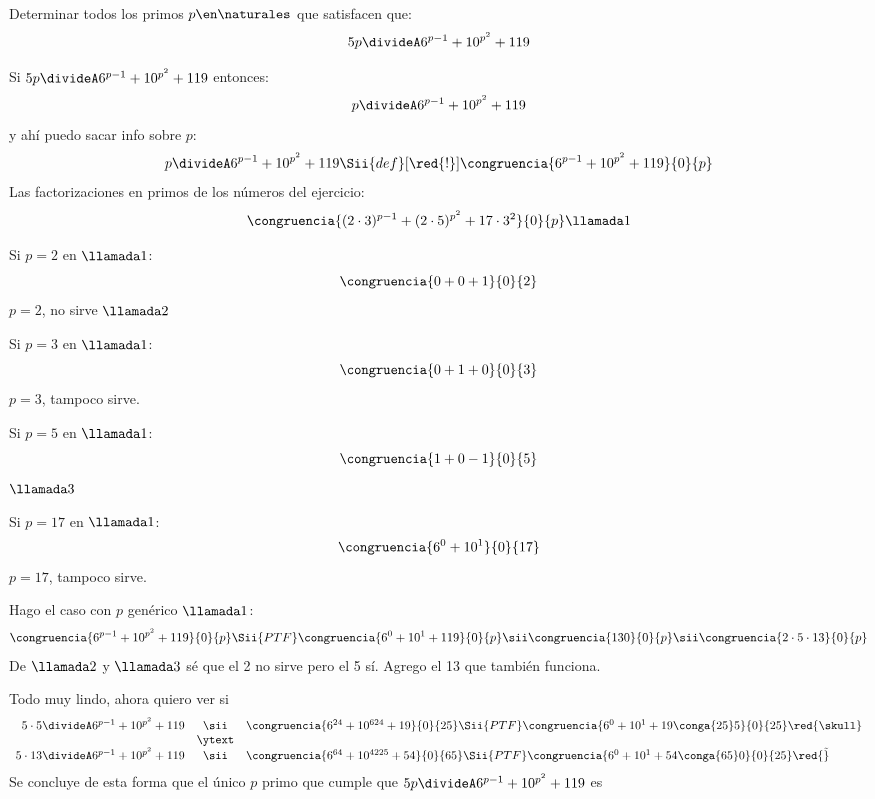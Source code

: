 \begin{enunciado}{\ejExtra}
	Determinar todos los primos $p \en \naturales$ que satisfacen que:
	$$
		5p \divideA 6^{p-1} + 10^{p^2} + 119
	$$
\end{enunciado}
Si $ 5p \divideA 6^{p-1} + 10^{p^2} + 119$ entonces:
$$
	p \divideA 6^{p-1} + 10^{p^2} + 119
$$
y ahí puedo sacar info sobre $p$:
$$
	p \divideA 6^{p-1} + 10^{p^2} + 119
	\Sii{def}[\red{!}]
	\congruencia{6^{p-1} + 10^{p^2} + 119}{0}{p}
$$
Las factorizaciones en primos de los números del ejercicio:
$$
	\congruencia{(2\cdot 3)^{p-1} + (2 \cdot 5)^{p^2} + 17 \cdot 3^2}{0}{p} \llamada1
$$

Si $p = 2$ en $\llamada1$:
$$
	\congruencia{0 + 0 + 1}{0}{2}
$$
$p = 2$, no sirve $\llamada2$

Si $p = 3$ en $\llamada1$:
$$
	\congruencia{0 + 1 + 0}{0}{3}
$$
$p = 3$, tampoco sirve.

Si $p = 5$ en $\llamada1$:
$$
	\congruencia{1 + 0 -1}{0}{5}
$$
 $\llamada3$

Si $p = 17$ en $\llamada1$:
$$
	\congruencia{6^0 + 10^1}{0}{17}
$$
$p = 17$, tampoco sirve.

\bigskip

Hago el caso con $p$ genérico $\llamada1$:
$$
	\congruencia{6^{p-1} + 10^{p^2} + 119}{0}{p}
	\Sii{PTF}
	\congruencia{6^0 + 10^1 + 119}{0}{p}
	\sii
	\congruencia{130}{0}{p}
	\sii
	\congruencia{2 \cdot 5 \cdot 13}{0}{p}
$$
De $\llamada2$ y $\llamada3$ sé que el 2 no sirve pero el 5 sí. Agrego el 13 que también funciona.

Todo muy lindo, ahora quiero ver si
$$
	\begin{array}{rcl}
		5 \cdot 5 \divideA 6^{p-1} + 10^{p^2} + 119
		 & \sii   &
		\congruencia{6^{24} + 10^{624} + 19}{0}{25}
		\Sii{PTF}
		\congruencia{6^0 + 10^1 + 19 \conga{25} 5}{0}{25} \red{\skull}
		\\
		 & \ytext & \\
		5 \cdot 13 \divideA 6^{p-1} + 10^{p^2} + 119
		 & \sii   &
		\congruencia{6^{64} + 10^{4225} + 54}{0}{65}
		\Sii{PTF}
		\congruencia{6^0 + 10^1 + 54 \conga{65} 0}{0}{25} \red{\Tilde}
	\end{array}
$$
Se concluye de esta forma que el único $p$ primo que cumple que
$5p \divideA 6^{p-1} + 10^{p^2} + 119$ es 


\begin{aportes}
	\item {}
\end{aportes}
